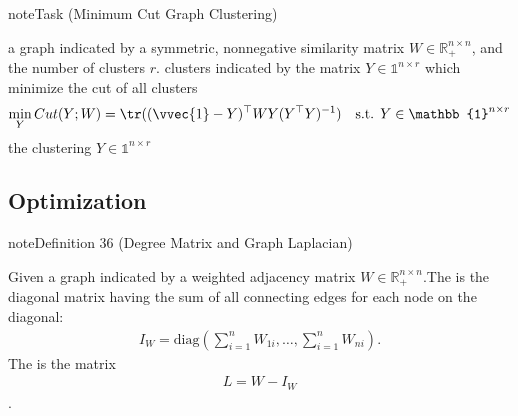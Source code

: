 \documentclass[letterpaper,10pt,english]{jupyterBook}
\begin{document}
\begin{sphinxadmonition}{note}{Task (Minimum Cut Graph Clustering)}

\sphinxAtStartPar
{} a graph indicated by a symmetric, nonnegative similarity matrix \(W\in\mathbb{R}_+^{n\times n}\), and the number of clusters \(r\). clusters indicated by the matrix \(Y\in\mathbb{1}^{n\times r}\) which minimize the cut of all clusters
\begin{align*}
 \min_YCut(Y;W)&=\tr((\vvec{1}-Y)^\top W Y(Y^\top Y)^{-1}) &\text{s.t. } Y\in\mathbb{1}^{n\times r}
\end{align*}
\sphinxAtStartPar
{} the clustering \(Y\in\mathbb{1}^{n\times r}\)
\end{sphinxadmonition}


\subsection{Optimization}
\label{\detokenize{clustering_spectral:optimization}}\label{clustering_spectral:definition-0}
\begin{sphinxadmonition}{note}{Definition 36 (Degree Matrix and Graph Laplacian)}



\sphinxAtStartPar
Given a graph indicated by a weighted adjacency matrix \(W\in\mathbb{R}_+^{n\times n}\).The  is the diagonal matrix having the sum of all connecting edges for each node on the diagonal: \begin{equation*}
\begin{split}I_W = \mathrm{diag}\left(\sum_{i=1}^n W_{1i},\ldots,\sum_{i=1}^n W_{ni}\right).\end{split}
\end{equation*}The  is the matrix \begin{equation*}
\begin{split}L=W-I_W\end{split}
\end{equation*}.
\end{sphinxadmonition}
\label{clustering_spectral:example-1}
\end{document}
